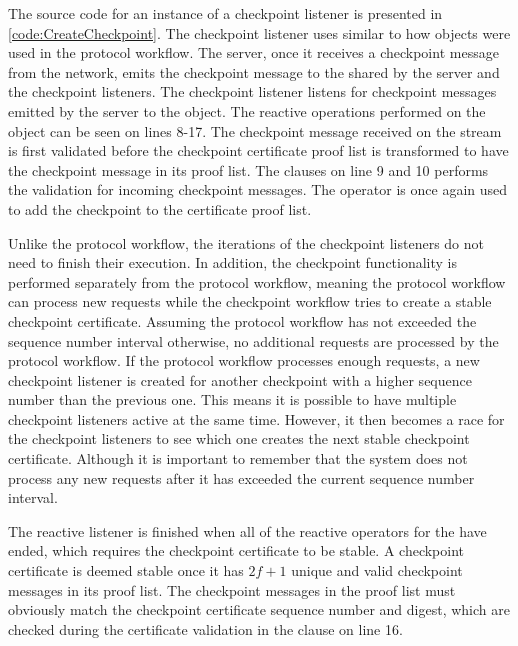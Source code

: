 The source code for an instance of a checkpoint listener is presented in \autoref{code:CreateCheckpoint}. The checkpoint listener uses  similar to how  objects were used in the protocol workflow. The server, once it receives a checkpoint message from the network, emits the checkpoint message to the  shared by the server and the checkpoint listeners. The checkpoint listener listens for checkpoint messages emitted by the server to the  object. The reactive operations performed on the  object can be seen on lines 8-17. The checkpoint message received on the stream is first validated before the checkpoint certificate proof list is transformed to have the checkpoint message in its proof list. The  clauses on line 9 and 10 performs the validation for incoming checkpoint messages. The  operator is once again used to add the checkpoint to the certificate proof list. 

Unlike the protocol workflow, the iterations of the checkpoint listeners do not need to finish their execution. In addition, the checkpoint functionality is performed separately from the protocol workflow, meaning the protocol workflow can process new requests while the checkpoint workflow tries to create a stable checkpoint certificate. Assuming the protocol workflow has not exceeded the sequence number interval otherwise, no additional requests are processed by the protocol workflow.
If the protocol workflow processes enough requests, a new checkpoint listener is created for another checkpoint with a higher sequence number than the previous one. This means it is possible to have multiple checkpoint listeners active at the same time. However, it then becomes a race for the checkpoint listeners to see which one creates the next stable checkpoint certificate. Although it is important to remember that the system does not process any new requests after it has exceeded the current sequence number interval. 

The reactive listener is finished when all of the reactive operators for the  have ended, which requires the checkpoint certificate to be stable. A checkpoint certificate is deemed stable once it has $2f+1$ unique and valid checkpoint messages in its proof list. The checkpoint messages in the proof list must obviously match the checkpoint certificate sequence number and digest, which are checked during the certificate validation in the  clause on line 16.
\fi

